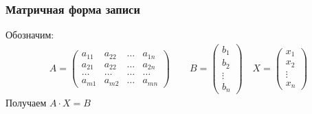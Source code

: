 \subsubsection{Матричная форма записи}
Обозначим: \vspace{-\topsep}\begin{gather*}
A = \begin{pmatrix}
a_{11} & a_{22} & \ldots & a_{1n} \\
a_{21} & a_{22} & \ldots & a_{2n} \\
\ldots & \ldots & \ldots & \ldots \\
a_{m1} & a_{m2} & \ldots & a_{mn}
\end{pmatrix} \qquad B = \begin{pmatrix}
b_1 \\
b_2 \\
\vdots \\
b_n
\end{pmatrix} \quad X = \begin{pmatrix}
x_1 \\
x_2 \\ 
\vdots \\
x_n
\end{pmatrix}
\end{gather*}
Получаем $A\cdot X = B$

